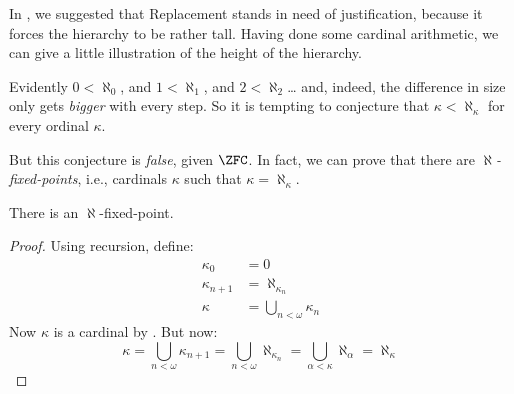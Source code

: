 \documentclass[../../../include/open-logic-section]{subfiles}
\begin{document}

In , we suggested that Replacement stands in need
of justification, because it forces the hierarchy to be rather tall.
Having done some cardinal arithmetic, we can give a little
illustration of the height of the hierarchy. 

Evidently $0 < \aleph_0$, and $1 < \aleph_1$, and $2 < \aleph_2$\ldots
and, indeed, the difference in size only gets \emph{bigger} with every
step. So it is tempting to conjecture that $\kappa< \aleph_\kappa$
for every ordinal $\kappa$. 

But this conjecture is \emph{false}, given $\ZFC$. In fact, we can
prove that there are \emph{$\aleph$-fixed-points}, i.e.,
cardinals $\kappa$ such that $\kappa=\aleph_\kappa$. 

\begin{prop}
There is an $\aleph$-fixed-point.
\end{prop}

\begin{proof}
Using recursion, define:
\begin{align*}
	\kappa_0 &= 0\\
	\kappa_{n+1} &= \aleph_{\kappa_n}\\
	\kappa&= \bigcup_{n < \omega}\kappa_n
\end{align*}
Now $\kappa$ is a cardinal by
. But now:
\[
	\kappa= \bigcup_{n < \omega} \kappa_{n+1} = 
	\bigcup_{n < \omega}\aleph_{\kappa_n} = 
	\bigcup_{\alpha < \kappa}\aleph_\alpha = \aleph_\kappa
\]
\end{proof}
\end{document}
